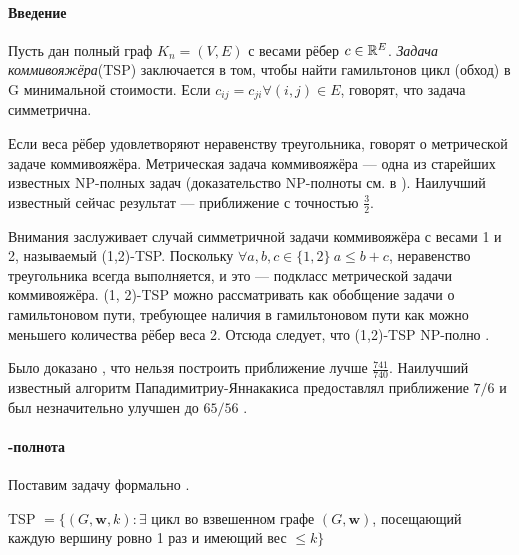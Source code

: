 

\date{}

\usepackage[]{algorithm2e}

\newcommand*\circled[1]{\tikz[baseline=(char.base)]{
		\node[shape=circle,draw,inner sep=2pt] (char) {#1};}}
	
\newtheorem{theorem}{Теорема}

\renewcommand{\G}{\mathcal{G}}


%

\paragraph{Введение}
Пусть дан полный граф $K_n = (V, E)$ с весами рёбер $c \in \mathbb{R}^E$. \textit{Задача коммивояжёра}(TSP) заключается в том, чтобы найти гамильтонов цикл (обход) в G минимальной стоимости. Если $c_{ij} = c_{ji} \forall (i, j)  \in E$, говорят, что задача симметрична. 

Если веса рёбер удовлетворяют неравенству треугольника, говорят о метрической задаче коммивояжёра. Метрическая задача коммивояжёра --- одна из старейших известных NP-полных задач (доказательство NP-полноты см. в \cite{JP85}). Наилучший известный сейчас результат --- приближение с точностью $\frac{3}{2}$\cite{C76}. 

Внимания заслуживает случай симметричной задачи коммивояжёра с весами 1 и 2, называемый (1,2)-TSP. Поскольку $\forall a, b, c \in \{1, 2\} \ a\le b+c$, неравенство треугольника всегда выполняется, и это --- подкласс метрической задачи коммивояжёра. (1, 2)-TSP можно рассматривать как обобщение задачи о гамильтоновом пути, требующее наличия в гамильтоновом пути как можно меньшего количества рёбер веса 2. Отсюда следует, что (1,2)-TSP NP-полно \cite{K72}. 

Было доказано \cite{EK01}, что нельзя построить приближение лучше $\frac{741}{740}$. Наилучший известный алгоритм Пападимитриу-Яннакакиса \cite{PY93} предоставлял приближение $7/6$ и был незначительно улучшен до $65/56$ \cite{BR05}. 

\paragraph{\NP-полнота}
Поставим задачу формально .

TSP $= \{ (G, \mathbf{w}, k): \exists$ цикл во взвешенном графе $(G, \mathbf{w})$, посещающий каждую вершину ровно 1 раз и имеющий вес $\le k \}$

